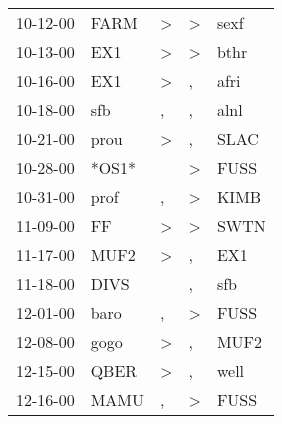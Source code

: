\begin{supertabular}{p{0.07\textwidth}p{0.06\textwidth}p{0.02\textwidth}p{0.02\textwidth}p{0.06\textwidth}}
          10-12-00\textsuperscript{} &           FARM\textsuperscript{} &     \textgreater &     \textgreater &           sexf\textsuperscript{} \\
          10-13-00\textsuperscript{} &            EX1\textsuperscript{} &     \textgreater &     \textgreater &           bthr\textsuperscript{} \\
          10-16-00\textsuperscript{} &            EX1\textsuperscript{} &     \textgreater &                , &           afri\textsuperscript{} \\
          10-18-00\textsuperscript{} &            sfb\textsuperscript{} &                , &                , &           alnl\textsuperscript{} \\
          10-21-00\textsuperscript{} &           prou\textsuperscript{} &     \textgreater &                , &           SLAC\textsuperscript{} \\
          10-28-00\textsuperscript{} &                            *OS1* &                  &     \textgreater &           FUSS\textsuperscript{} \\
          10-31-00\textsuperscript{} &           prof\textsuperscript{} &                , &     \textgreater &           KIMB\textsuperscript{} \\
          11-09-00\textsuperscript{} &             FF\textsuperscript{} &     \textgreater &     \textgreater &           SWTN\textsuperscript{} \\
          11-17-00\textsuperscript{} &           MUF2\textsuperscript{} &     \textgreater &                , &            EX1\textsuperscript{} \\
          11-18-00\textsuperscript{} &           DIVS\textsuperscript{} &                  &                , &            sfb\textsuperscript{} \\
          12-01-00\textsuperscript{} &           baro\textsuperscript{} &                , &     \textgreater &           FUSS\textsuperscript{} \\
          12-08-00\textsuperscript{} &           gogo\textsuperscript{} &     \textgreater &                , &           MUF2\textsuperscript{} \\
          12-15-00\textsuperscript{} &           QBER\textsuperscript{} &     \textgreater &                , &           well\textsuperscript{} \\
          12-16-00\textsuperscript{} &           MAMU\textsuperscript{} &                , &     \textgreater &           FUSS\textsuperscript{} \\

\end{supertabular}
